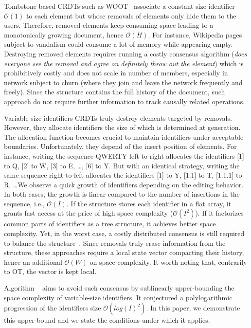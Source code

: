 \begin{asparadesc}
\item [Tombstone-based] CRDTs such as WOOT~\cite{oster2006data} associate a
  constant size identifier $\mathcal{O}(1)$ to each element but whose removals
  of elements only hide them to the users. Therefore, removed elements keep
  consuming space leading to a monotonically growing document, hence
  $\mathcal{O}(H)$. For instance, Wikipedia pages subject to vandalism could
  consume a lot of memory while appearing empty. Destroying removed elements
  requires running a costly consensus algorithm (\emph{does everyone see the
    removal and agree on definitely throw out the element}) which is
  prohibitively costly and does not scale in number of members, especially in
  network subject to churn (where they join and leave the network frequently and
  freely). Since the structure contains the full history of the document, such
  approach do not require further information to track causally related
  operations.

\item [Variable-size identifiers] CRDTs truly destroy elements targeted by
  removals. However, they allocate identifiers the size of which is determined
  at generation. The allocation function becomes crucial to maintain identifiers
  under acceptable boundaries. Unfortunately, they depend of the insert position
  of elements. For instance, writing the sequence QWERTY left-to-right allocates
  the identifiers [1] to Q, [2] to W, [3] to E, \ldots, [6] to Y. But with an
  identical strategy, writing the same sequence right-to-left allocates the
  identifiers [1] to Y, [1.1] to T, [1.1.1] to R, \ldots We observe a quick
  growth of identifiers depending on the editing behavior. In both cases, the
  growth is linear compared to the number of insertions in the sequence, i.e.,
  $\mathcal{O}(I)$. If the structure stores each identifier in a flat array, it
  grants fast access at the price of high space complexity
  ($\mathcal{O}(I^2)$). If it factorizes common parts of identifiers as a tree
  structure, it achieves better space complexity. Yet, in the worst case, a
  costly distributed consensus is still required to balance the
  structure~\cite{zawirski2011asynchronous}. Since removals truly erase
  information from the structure, these approaches require a local state vector
  compacting their history, hence an additional $\mathcal{O}(W)$ on
  space complexity. It worth noting that, contrarily to OT, the vector is kept
  local.

  Algorithm \LSEQ~\cite{nedelec2013lseq} aims to avoid such consensus by
  sublinearly upper-bounding the space complexity of variable-size
  identifiers. It conjectured a polylogarithmic progression of the identifiers
  size $\mathcal{O}(log(I)^2)$. In this paper, we demonstrate this upper-bound
  and we state the conditions under which it applies.

\end{asparadesc}

